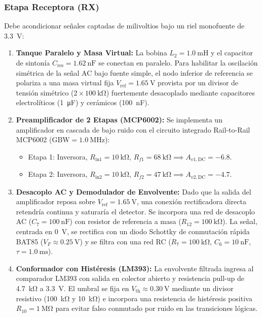 \subsubsection{Etapa Receptora (RX)}
Debe acondicionar señales captadas de milivoltios bajo un riel monofuente de \SI{3.3}{\volt}:
\begin{enumerate}
    \item \textbf{Tanque Paralelo y Masa Virtual:} La bobina $L_2 = \SI{1.0}{\milli\henry}$ y el capacitor de sintonía $C_{\text{res}} = \SI{1.62}{\nano\farad}$ se conectan en paralelo. Para habilitar la oscilación simétrica de la señal AC bajo fuente simple, el nodo inferior de referencia se polariza a una masa virtual fija $V_{\text{ref}} = \SI{1.65}{\volt}$ provista por un divisor de tensión simétrico ($2 \times \SI{100}{\kilo\ohm}$) fuertemente desacoplado mediante capacitores electrolíticos (\SI{1}{\micro\farad}) y cerámicos (\SI{100}{\nano\farad}).
    \item \textbf{Preamplificador de 2 Etapas (MCP6002):} Se implementa un amplificador en cascada de bajo ruido con el circuito integrado Rail-to-Rail MCP6002 ($\text{GBW} = \SI{1.0}{\mega\hertz}$):
    \begin{itemize}
        \item Etapa 1: Inversora, $R_{\text{in1}} = \SI{10}{\kilo\ohm}$, $R_{f1} = \SI{68}{\kilo\ohm} \implies A_{v1,\text{DC}} = -6.8$.
        \item Etapa 2: Inversora, $R_{\text{in2}} = \SI{10}{\kilo\ohm}$, $R_{f2} = \SI{47}{\kilo\ohm} \implies A_{v2,\text{DC}} = -4.7$.
    \end{itemize}
    \item \textbf{Desacoplo AC y Demodulador de Envolvente:} Dado que la salida del amplificador reposa sobre $V_{\text{ref}} = \SI{1.65}{\volt}$, una conexión rectificadora directa retendría continua y saturaría el detector. Se incorpora una red de desacoplo AC ($C_7 = \SI{100}{\nano\farad}$) con resistor de referencia a masa ($R_{12} = \SI{100}{\kilo\ohm}$). La señal, centrada en \SI{0}{\volt}, se rectifica con un diodo Schottky de conmutación rápida BAT85 ($V_F \approx \SI{0.25}{\volt}$) y se filtra con una red RC ($R_7 = \SI{100}{\kilo\ohm}$, $C_6 = \SI{10}{\nano\farad}$, $\tau = \SI{1.0}{\milli\second}$).
    \item \textbf{Conformador con Histéresis (LM393):} La envolvente filtrada ingresa al comparador LM393 con salida en colector abierto y resistencia pull-up de \SI{4.7}{\kilo\ohm} a \SI{3.3}{\volt}. El umbral se fija en $V_{\text{th}} \approx \SI{0.30}{\volt}$ mediante un divisor resistivo (\SI{100}{\kilo\ohm} y \SI{10}{\kilo\ohm}) e incorpora una resistencia de histéresis positiva $R_{10} = \SI{1}{\mega\ohm}$ para evitar falso conmutado por ruido en las transiciones lógicas.
\end{enumerate}

